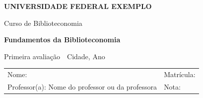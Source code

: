\documentclass[11pt,a4paper,addpoints]{exam}
\newif\ifinstrucoes
\newcommand{\instrucao}[1]{\ifinstrucoes{\color{gray}\small\itshape #1\par}\fi}
\newcommand{\universidade}{Universidade Federal Exemplo}
\newcommand{\curso}{Curso de Biblioteconomia}
\newcommand{\disciplina}{Fundamentos da Biblioteconomia}
\newcommand{\avaliacao}{Primeira avaliação}
\newcommand{\professor}{Nome do professor ou da professora}
\newcommand{\local}{Cidade}
\newcommand{\data}{Ano}
\begin{document}
\begin{center}
  {\large\bfseries\MakeUppercase{\universidade}\par}
  \curso\par
  \medskip
  {\Large\bfseries\color{vinho}\disciplina\par}
  \avaliacao\ \textbullet\ \local, \data\par
\end{center}

\vspace{1ex}
\noindent\begin{tabular}{@{}p{}p{}@{}}
  Nome: \hrulefill & Matrícula: \hrulefill \\[2ex]
  Professor(a): \professor & Nota: \hrulefill
\end{tabular}

\vspace{2ex}
\instrucao{Escreva as regras da prova em três a cinco itens curtos: duração, material permitido, como marcar a resposta e o valor das questões.}
\noindent{}

\vspace{2ex}
\instrucao{Cada questão deve medir um conteúdo do plano de ensino. Escreva o enunciado completo e quatro alternativas plausíveis; troque \textbackslash choice por \textbackslash CorrectChoice na alternativa certa.}
\end{document}
